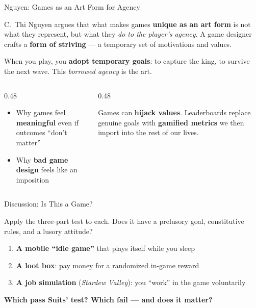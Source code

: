\documentclass[aspectratio=169,11pt]{beamer}
\begin{document}
\begin{frame}[t]{Nguyen: Games as an Art Form for Agency}
\begin{conceptbox}
\footnotesize
C.~Thi Nguyen argues that what makes games \textbf{unique as an art form} is not what they represent, but what they \emph{do to the player's agency}. A game designer crafts a \textbf{form of striving} --- a temporary set of motivations and values.

\vspace{0.05cm}
When you play, you \textbf{adopt temporary goals}: to capture the king, to survive the next wave. This \emph{borrowed agency} is the art.
\end{conceptbox}

\vspace{0.05cm}
\begin{columns}[T]
\begin{column}{0.48\textwidth}
\begin{probox}
\scriptsize
\begin{itemize}
    \item Why games feel \textbf{meaningful} even if outcomes ``don't matter''
    \item Why \textbf{bad game design} feels like an imposition
\end{itemize}
\end{probox}
\end{column}
\begin{column}{0.48\textwidth}
\begin{objectionbox}
\scriptsize
Games can \textbf{hijack values}. Leaderboards replace genuine goals with \textbf{gamified metrics} we then import into the rest of our lives.
\end{objectionbox}
\end{column}
\end{columns}
\end{frame}

\begin{frame}{Discussion: Is This a Game?}
\begin{discussionbox}
\footnotesize
Apply the three-part test to each. Does it have a prelusory goal, constitutive rules, and a lusory attitude?
\begin{enumerate}
    \item \textbf{A mobile ``idle game''} that plays itself while you sleep
    \item \textbf{A loot box}: pay money for a randomized in-game reward
    \item \textbf{A job simulation} (\emph{Stardew Valley}): you ``work'' in the game voluntarily
\end{enumerate}
\textbf{Which pass Suits' test? Which fail --- and does it matter?}
\end{discussionbox}
\end{frame}
\end{document}
